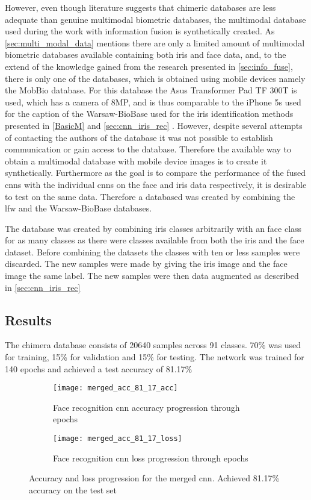 However, even though literature suggests that chimeric databases are less adequate than genuine multimodal biometric databases, the multimodal database used during the work with information fusion is synthetically created. As \autoref{sec:multi_modal_data} mentions there are only a limited amount of multimodal biometric databases available containing both iris and face data, and, to the extend of the knowledge gained from the research presented in \autoref{sec:info_fuse}, there is only one of the databases, which is obtained using mobile devices namely the MobBio database. For this database the Asus Transformer Pad TF 300T is used, which has a camera of 8MP, and is thus comparable to the iPhone 5s used for the caption of the Warsaw-BioBase used for the iris identification methods presented in \autoref{BasicM} and \autoref{sec:cnn_iris_rec} \citep{Sequeira2014}. However, despite several attempts of contacting the authors of the database it was not possible to establish communication or gain access to the database. Therefore the available way to obtain a multimodal database with mobile device images is to create it synthetically. Furthermore as the goal is to compare the performance of the fused \gls{cnn}s with the individual \gls{cnn}s on the face and iris data respectively, it is desirable to test on the same data. Therefore a databased was created by combining the \gls{lfw} and the Warsaw-BioBase databases. 

The database was created by combining iris classes arbitrarily with an face class for as many classes as there were classes available from both the iris and the face dataset. Before combining the datasets the classes with ten or less samples were discarded. The new samples were made by giving the iris image and the face image the same label. The new samples were then data augmented as described in \autoref{sec:cnn_iris_rec}

\subsection{Results}
The chimera database consists of 20640 samples across 91 classes. 70\% was used for training, 15\% for validation and 15\% for testing. The network was trained for 140 epochs and achieved a test accuracy of 81.17\%

\begin{figure}[H]
	\centering
	\begin{subfigure}{0.48\textwidth}
		\centering
		\texttt{[image: merged\_acc\_81\_17\_acc]}
		\caption{Face recognition \gls{cnn} accuracy progression through epochs}
		\label{fig:merged_acc}
	\end{subfigure}
	\begin{subfigure}{0.48\textwidth}
		\centering
		\texttt{[image: merged\_acc\_81\_17\_loss]}
		\caption{Face recognition \gls{cnn} loss progression through epochs}
		\label{fig:merged_loss}
	\end{subfigure}
	\caption{Accuracy and loss progression for the merged \gls{cnn}. Achieved 81.17\% accuracy on the test set}
	\label{fig:merged_graphs}
\end{figure}

